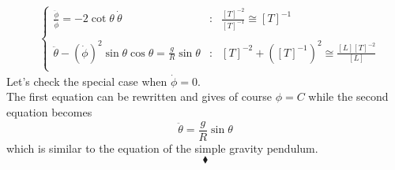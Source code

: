 \begin{align}
&\left\{\begin{array}{lll}
\frac{\ddot{\phi}}{\dot{\phi}}=  -2\cot\theta \  \dot{\theta}&:&\frac{[T]^{-2}}{[T]^{-1}}\cong [T]^{-1}\\\\
\ddot{\theta} - \left(\dot{\phi}\right)^2\sin\theta \cos\theta= \frac{g}{R}\sin{\theta}&:&[T]^{-2}+\left([T]^{-1}\right)^2 \cong \frac{[L][T]^{-2}}{[L]^{}}\\\
\end{array}\right.
\end{align}
Let's check the special case when $\dot{\phi} = 0$.\\
The first equation can be rewritten and gives of course $\phi=C$ while the second equation becomes $$\ddot{\theta} = \frac{g}{R}\sin{\theta}$$
which is similar to the equation of  the simple gravity pendulum.
$$\blacklozenge$$
\newpage

